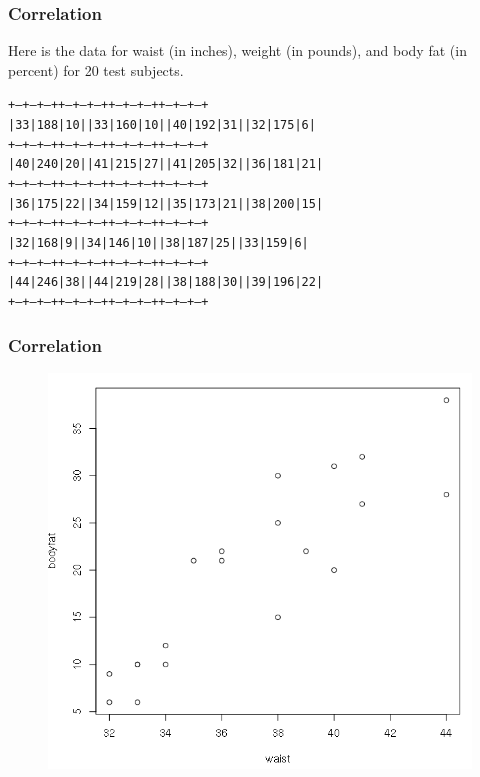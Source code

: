 \documentclass[xcolor=dvipsnames]{beamer}
\begin{document}
\begin{frame}
  \frametitle{Correlation}
  Here is the data for waist (in inches), weight (in pounds), and body
  fat (in percent) for 20 test subjects.


\begin{alltt}
\scriptsize
+---+---+--++---+---+---++---+---+---++---+---+--+\newline
| 33|188|10|| 33|160| 10|| 40|192| 31|| 32|175| 6|\newline
+---+---+--++---+---+---++---+---+---++---+---+--+\newline
| 40|240|20|| 41|215| 27|| 41|205| 32|| 36|181|21|\newline
+---+---+--++---+---+---++---+---+---++---+---+--+\newline
| 36|175|22|| 34|159| 12|| 35|173| 21|| 38|200|15|\newline
+---+---+--++---+---+---++---+---+---++---+---+--+\newline
| 32|168| 9|| 34|146| 10|| 38|187| 25|| 33|159| 6|\newline
+---+---+--++---+---+---++---+---+---++---+---+--+\newline
| 44|246|38|| 44|219| 28|| 38|188| 30|| 39|196|22|\newline
+---+---+--++---+---+---++---+---+---++---+---+--+
\end{alltt}
\end{frame}

\begin{frame}
  \frametitle{Correlation}
\begin{figure}[h]
\includegraphics[scale=.35]{./diagrams/bf-01.png}
\end{figure}
\end{frame}
\end{document}
